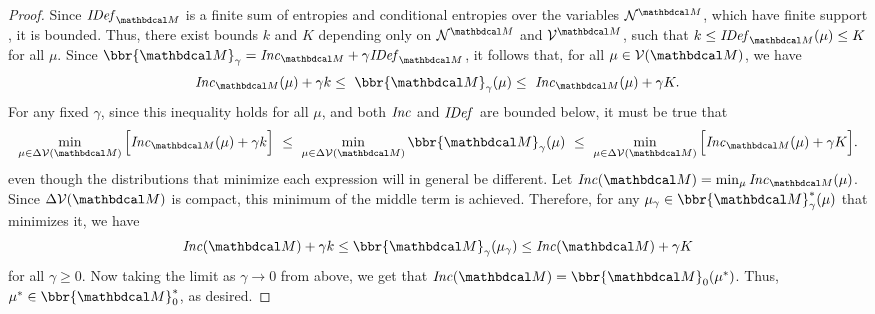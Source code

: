 \begin{proof}
Since $\IBal{\dg M}$ is a finite sum of entropies
and conditional entropies over the variables $\N^{\dg M}$, which have finite support%
, it is bounded.
Thus, there exist bounds $k$ and $K$ depending only on $\N^{\dg M}$ and
$\V^{\dg M}$, such that $\lb \leq \IBal{\dg M}(\mu) \leq \ub$ for all $\mu$.
%
Since $\bbr{\dg M}_\gamma = \Inc_{\dg M} + \gamma \IBal{\dg M}$,
it follows that, for all $\mu \in \V(\dg M)$, we have
\[ \Inc_{\dg M}( \mu) + \gamma\lb \leq~ \bbr{\dg M }_\gamma(\mu) 
\leq~  \Inc_{\dg M}( \mu) + \gamma\ub. \]
For any fixed $\gamma$, since this inequality holds for all $\mu$, and both $\mathit{Inc}$ and $\mathit{IDef}_{}$ are bounded below, it must be true that 
\[
\min_{\mu \in \Delta\V(\dg M)} \Big[ \Inc_{\dg M}( \mu) + \gamma\lb \Big]
~\leq~ \min_{\mu \in \Delta\V(\dg M)}\bbr{\dg M }_\gamma(\mu) ~\leq~  \min_{\mu \in \Delta\V(\dg M)} \Big[ \Inc_{\dg M}( \mu) + \gamma\ub \Big]. \]
even though the distributions that minimize each expression will in general be different.
Let $\Inc(\dg M) = \min_{\mu} \Inc_{\dg M}(\mu)$.
Since $\Delta\V(\dg M)$ is compact, this minimum of the middle term is achieved. 
Therefore, for any $\mu_\gamma \in \bbr{\dg M}^*_\gamma(\mu)$ that minimizes it, we have
$$\Inc(\dg M) +\gamma \lb \le \bbr{\dg M }_\gamma(\mu_\gamma) \le
		 \Inc(\dg M) +\gamma \ub$$ for all $\gamma \ge 0.$
Now taking the limit as $\gamma\rightarrow 0$ from above, we get that
$\Inc(\dg M) = \bbr{\dg M }_0(\mu^*)$.
Thus, $\mu^* \in \bbr{\dg M}_0^*$, as desired.
\end{proof}

